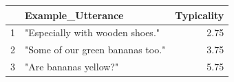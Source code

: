 \documentclass[10pt, letterpaper]{article}
\newenvironment{CodeChunk}{}{}
\begin{document}
\begin{CodeChunk}
\begin{CodeOutput}
\begin{table}[ht]
\centering
\begin{tabular}{rlr}
  \hline
 & Example\_Utterance & Typicality \\ 
  \hline
1 & "Especially with wooden shoes." & 2.75 \\ 
  2 & "Some of our green bananas too." & 3.75 \\ 
  3 & "Are bananas yellow?" & 5.75 \\ 
   \hline
\end{tabular}
\end{table}
\end{CodeOutput}
\end{CodeChunk}
\end{document}
